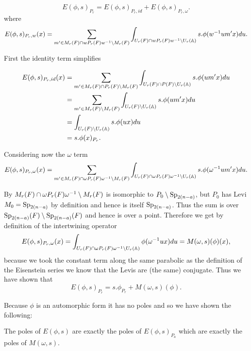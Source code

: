      \[E(\phi, s)_{P_r} = E(\phi, s)_{P_r, id} + E(\phi, s)_{P_r, \omega}.\]
     where 
     \[E(\phi, s)_{P_r, w}(x) =  \sum_{m'\in M_r(F)\cap wP_r(F)w\inv\setminus M_r(F)} \int_{U_r(F)\cap wP_r(F)w\inv \setminus U_r(\A)} s.\phi( w\inv um' x)  du.\]

First the identity term simplifies

     \begin{equation*}
        \begin{aligned}
            E(\phi, s)_{P_r, id} (x)&=  \sum_{m'\in M_r(F)\cap P_r(F)\setminus M_r(F)} \int_{U_r(F)\cap P(F) \setminus U_r(\A)} s.\phi( um' x)  du\\
            &= \sum_{m'\in M_r(F)\setminus M_r(F)} \int_{U_r(F)\setminus U_r(\A)} s.\phi( um' x)  du \\
            &=\int_{U_r(F)\setminus U_r(\A)} s.\phi( u x)  du \\
            &= s.\phi(x)_{P_r}.
        \end{aligned}
     \end{equation*}

     Considering now the \(\omega\) term 
     \[E(\phi, s)_{P_r, \omega}(x) =  \sum_{m'\in M_r(F)\cap \omega P_r(F)\omega\inv\setminus M_r(F)} \int_{U_r(F)\cap \omega P_r(F)\omega\inv \setminus U_r(\A)} s.\phi( \omega\inv um' x)  du.\]

     By \cite[2C]{jiangPolesCertainResidual2013} \(M_r(F)\cap \omega P_r(F)\omega^{-1} \setminus M_r(F)\) is isomorphic to \(P_0 \setminus \operatorname{Sp}_{2(n-a)}\), but \(P_0\) has Levi \(M_0 = \operatorname{Sp}_{2(n-a)}\) by definition and hence is itself \(\operatorname{Sp}_{2(n-a)}\). Thus the sum is over \(\operatorname{Sp}_{2(n-a)}(F) \setminus \operatorname{Sp}_{2(n-a)}(F)\) and hence is over a point. Therefore we get by definition of the intertwining operator
     \[E(\phi, s)_{P_r, \omega}(x) = \int_{U_r(F)\cap \omega P_r(F)\omega\inv \setminus U_r(\A)} \phi( \omega\inv u x)  du = M(\omega, s)(\phi)(x),\]
     because we took the constant term along the same parabolic as the definition of the Eisenstein series we know that the Levis are (the same) conjugate.
    Thus we have shown that 
    \[E(\phi, s)_{P_r} = s.\phi_{P_r} + M(\omega, s )(\phi).\]
    
    Because \(\phi\) is an automorphic form it has no poles and so we have shown the following:
    \begin{Lemma}
        The poles of \(E(\phi, s)\) are exactly the poles of \(E(\phi,s)_{P_a}\) which are exactly the poles of \(M(\omega, s)\).
    \end{Lemma}
    

